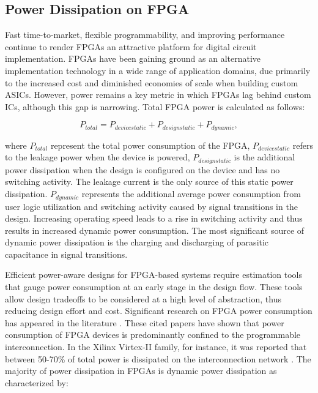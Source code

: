 \subsection{Power Dissipation on FPGA}

Fast time-to-market, flexible programmability, and improving performance continue to render FPGAs an attractive platform for digital circuit implementation. 
FPGAs have been gaining ground as an alternative implementation technology in a wide range of application domains, due primarily to the increased cost and diminished economies of scale when building custom ASICs. 
However, power remains a key metric in which FPGAs lag behind custom ICs, although this gap is narrowing.
Total FPGA power is calculated as follows: 
\begin{center}
\begin{equation}
\label{Equ:Ptotal}
 P_{total} = P_{device static} + P_{design static} + P_{dynamic},
\end{equation}
\end{center}
where $P_{total}$ represent the total power consumption of the FPGA, $P_{device static}$ refers to the leakage power when the device is powered, $P_{design static}$ is the additional power dissipation when the design is configured on the device and has no switching activity. The leakage current is the only source of this static power dissipation.
$P_{dynamic}$ represents the additional average power consumption from user logic utilization and switching activity caused by signal transitions in the design. Increasing operating speed leads to a rise in switching activity and thus results in increased dynamic power consumption. The most significant source of dynamic power dissipation is the charging and discharging of parasitic capacitance in signal transitions.

Efficient power-aware designs for FPGA-based systems require estimation tools that gauge power consumption at an early stage in the design flow.
These tools allow design tradeoffs to be considered at a high level of abstraction, thus reducing design effort and cost.
Significant research on FPGA power consumption has appeared in the literature \cite {Shang2002,Anderson2004a,Anderson2004,Todorovich2005,Reimer2006}. 
These cited papers have shown that power consumption of FPGA devices is predominantly confined to the programmable interconnection. 
In the Xilinx Virtex-II family, for instance, it was reported that between 50-70\% of total power is dissipated on the interconnection network \cite{Shang2002}.
The majority of power dissipation in FPGAs is dynamic power dissipation \cite{Shang2002} as characterized by:

